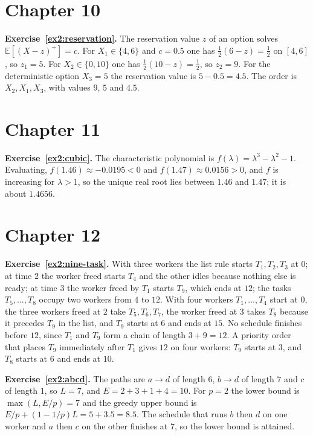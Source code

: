 \section*{Chapter 10}

\textbf{Exercise~\ref{ex2:reservation}.} The reservation value $z$ of an option solves $\mathbb E[(X-z)^{+}]=c$. For $X_1\in\{4,6\}$ and $c=0.5$ one has $\tfrac12(6-z)=\tfrac12$ on $[4,6]$, so $z_1=5$. For $X_2\in\{0,10\}$ one has $\tfrac12(10-z)=\tfrac12$, so $z_2=9$. For the deterministic option $X_3=5$ the reservation value is $5-0.5=4.5$. The order is $X_2,X_1,X_3$, with values $9$, $5$ and $4.5$.

\section*{Chapter 11}

\textbf{Exercise~\ref{ex2:cubic}.} The characteristic polynomial is $f(\lambda)=\lambda^{3}-\lambda^{2}-1$. Evaluating, $f(1.46)\approx-0.0195<0$ and $f(1.47)\approx0.0156>0$, and $f$ is increasing for $\lambda>1$, so the unique real root lies between $1.46$ and $1.47$; it is about $1.4656$.

\section*{Chapter 12}

\textbf{Exercise~\ref{ex2:nine-task}.} With three workers the list rule starts $T_1,T_2,T_3$ at $0$; at time $2$ the worker freed starts $T_4$ and the other idles because nothing else is ready; at time $3$ the worker freed by $T_1$ starts $T_9$, which ends at $12$; the tasks $T_5,\dots,T_8$ occupy two workers from $4$ to $12$. With four workers $T_1,\dots,T_4$ start at $0$, the three workers freed at $2$ take $T_5,T_6,T_7$, the worker freed at $3$ takes $T_8$ because it precedes $T_9$ in the list, and $T_9$ starts at $6$ and ends at $15$. No schedule finishes before $12$, since $T_1$ and $T_9$ form a chain of length $3+9=12$. A priority order that places $T_9$ immediately after $T_1$ gives $12$ on four workers: $T_9$ starts at $3$, and $T_8$ starts at $6$ and ends at $10$.

\textbf{Exercise~\ref{ex2:abcd}.} The paths are $a\to d$ of length $6$, $b\to d$ of length $7$ and $c$ of length $1$, so $L=7$, and $E=2+3+1+4=10$. For $p=2$ the lower bound is $\max(L,E/p)=7$ and the greedy upper bound is $E/p+(1-1/p)L=5+3.5=8.5$. The schedule that runs $b$ then $d$ on one worker and $a$ then $c$ on the other finishes at $7$, so the lower bound is attained.

